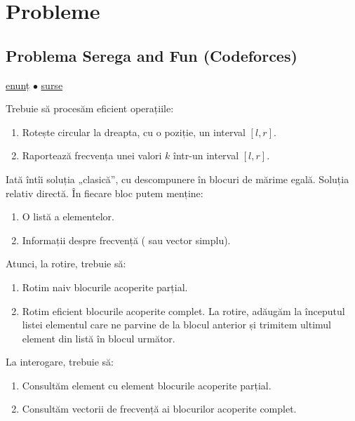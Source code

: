 \documentclass[../main.tex]{subfiles}
\begin{document}
\section{Probleme}

\subsection{Problema Serega and Fun (Codeforces)}
\label{problem:serega-and-fun}

\href{https://codeforces.com/contest/455/problem/D}{enunț}
$\bullet$
\hyperref[code:serega-and-fun]{surse}

Trebuie să procesăm eficient operațiile:

\begin{enumerate}
  \item Rotește circular la dreapta, cu o poziție, un interval $[l, r]$.
  \item Raportează frecvența unei valori $k$ într-un interval $[l, r]$.
\end{enumerate}

Iată întîi soluția „clasică”, cu descompunere în blocuri de mărime egală. Soluția relativ directă. În fiecare bloc putem menține:

\begin{enumerate}
  \item O listă a elementelor.
  \item Informații despre frecvență ( sau vector simplu).
\end{enumerate}

Atunci, la rotire, trebuie să:

\begin{enumerate}
  \item Rotim naiv blocurile acoperite parțial.
  \item Rotim eficient blocurile acoperite complet. La rotire, adăugăm la începutul listei elementul care ne parvine de la blocul anterior și trimitem ultimul element din listă în blocul următor.
\end{enumerate}

La interogare, trebuie să:

\begin{enumerate}
  \item Consultăm element cu element blocurile acoperite parțial.
  \item Consultăm vectorii de frecvență ai blocurilor acoperite complet.
\end{enumerate}
\end{document}

